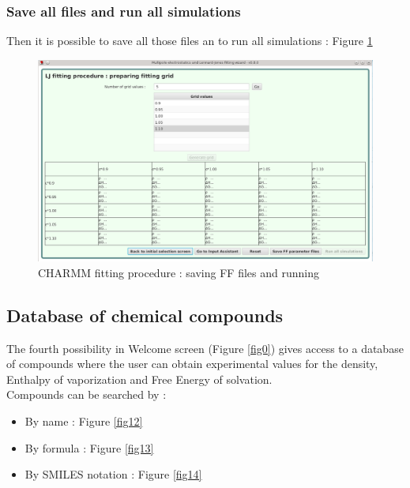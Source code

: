 \documentclass[12pt,a4paper]{article}
\begin{document}
\subsubsection{Save all files and run all simulations}

Then it is possible to save all those files an to run all simulations : Figure \ref{fig11}

\begin{figure}[h!]
\centering
\includegraphics[width=0.9\linewidth]{pics/scr11}
\caption{CHARMM fitting procedure : saving FF files and running}
\label{fig11}
\end{figure}

\clearpage

\subsection{Database of chemical compounds}

The fourth possibility in Welcome screen (Figure \ref{fig0}) gives access to a database of 
compounds where the user can obtain experimental values for the density, Enthalpy of vaporization 
and Free Energy of solvation.\\

Compounds can be searched by : 

\begin{itemize}
\item By name : Figure \ref{fig12}
\item By formula : Figure \ref{fig13}
\item By SMILES notation : Figure \ref{fig14}
\end{itemize}
\end{document}
